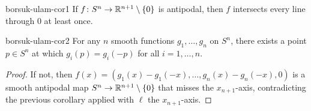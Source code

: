 \begin{corollary}{}{borsuk-ulam-cor1}
    If $f \colon S^n \to \mathbb{R}^{n+1} \setminus \{0\}$ is antipodal, then $f$ intersects every line through $0$ at least once.
\end{corollary}

\begin{corollary}{}{borsuk-ulam-cor2}
    For any $n$ smooth functions $g_1, \ldots, g_n$ on $S^n$, there exists a point $p \in S^n$ at which $g_i(p) = g_i(-p)$ for all $i = 1, \ldots, n$.
\end{corollary}

\begin{proof}
    If not, then $f(x) = (g_1(x) - g_1(-x), \ldots, g_n(x) - g_n(-x), 0)$ is a smooth antipodal map $S^n \to \mathbb{R}^{n+1} \setminus \{0\}$ that misses the $x_{n+1}$-axis, contradicting the previous corollary applied with $\ell$ the $x_{n+1}$-axis.
\end{proof}
